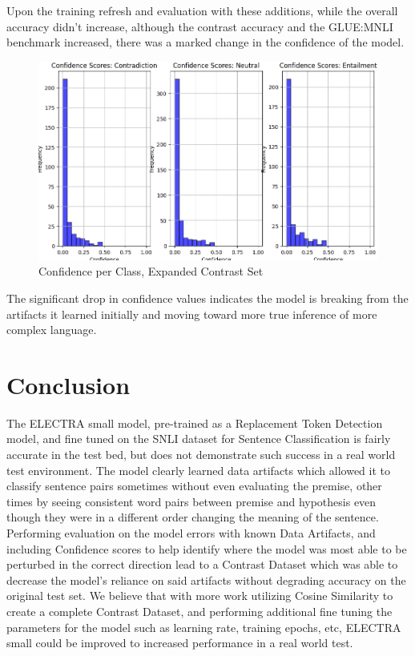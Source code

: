 \documentclass[11pt]{article}
\begin{document}
Upon the training refresh and evaluation with these additions, while the overall accuracy didn't increase, although the contrast accuracy and the GLUE:MNLI benchmark increased, there was a marked change in the confidence of the model.
\begin{figure}[h!]
    \centering
    \includegraphics[width=0.5\linewidth]{Figure_confByClass3.png}
    \caption{Confidence per Class, Expanded Contrast Set}
    \label{fig:Confidence3}
\end{figure}
The significant drop in confidence values indicates the model is breaking from the artifacts it learned initially and moving toward more true inference of more complex language.

\section{Conclusion}
The ELECTRA small model, pre-trained as a Replacement Token Detection model, and fine tuned on the SNLI dataset for Sentence Classification is fairly accurate in the test bed, but does not demonstrate such success in a real world test environment. The model clearly learned data artifacts which allowed it to classify sentence pairs sometimes without even evaluating the premise, other times by seeing consistent word pairs between premise and hypothesis even though they were in a different order changing the meaning of the sentence.
Performing evaluation on the model errors with known Data Artifacts, and including Confidence scores to help identify where the model was most able to be perturbed in the correct direction lead to a Contrast Dataset which was able to decrease the model's reliance on said artifacts without degrading accuracy on the original test set.
We believe that with more work utilizing Cosine Similarity to create a complete Contrast Dataset, and performing additional fine tuning the parameters for the model such as learning rate, training epochs, etc, ELECTRA small could be improved to increased performance in a real world test.


\end{document}
